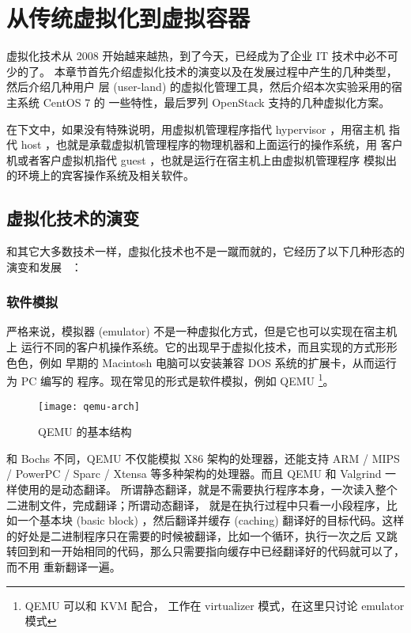 \chapter{从传统虚拟化到虚拟容器}
\label{cha:virtualization-and-container}

虚拟化技术从 2008 开始越来越热，到了今天，已经成为了企业 IT 技术中必不可少的了。
本章节首先介绍虚拟化技术的演变以及在发展过程中产生的几种类型，然后介绍几种用户
层 (user-land) 的虚拟化管理工具，然后介绍本次实验采用的宿主系统 CentOS 7 的
一些特性，最后罗列 OpenStack 支持的几种虚拟化方案。

在下文中，如果没有特殊说明，用虚拟机管理程序指代 hypervisor ，用宿主机
指代 host ，也就是承载虚拟机管理程序的物理机器和上面运行的操作系统，用
客户机或者客户虚拟机指代 guest ，也就是运行在宿主机上由虚拟机管理程序
模拟出的环境上的宾客操作系统及相关软件。

\section{虚拟化技术的演变}

和其它大多数技术一样，虚拟化技术也不是一蹴而就的，它经历了以下几种形态的演变和发展
~\cite{deep-into-kvm}：

\subsection{软件模拟}

严格来说，模拟器 (emulator) 不是一种虚拟化方式，但是它也可以实现在宿主机上
运行不同的客户机操作系统。它的出现早于虚拟化技术，而且实现的方式形形色色，例如
早期的 Macintosh 电脑可以安装兼容 DOS 系统的扩展卡，从而运行为 PC 编写的
程序。现在常见的形式是软件模拟，例如 QEMU \footnote{QEMU 可以和 KVM 配合，
工作在 virtualizer 模式，在这里只讨论 emulator 模式}。

\begin{figure}[h]
    \centering
    \texttt{[image: qemu-arch]}
    \caption{QEMU 的基本结构}
\end{figure}

和 Bochs 不同，QEMU 不仅能模拟 X86 架构的处理器，还能支持 ARM / MIPS / PowerPC
 / Sparc / Xtensa 等多种架构的处理器。而且 QEMU 和 Valgrind 一样使用的是动态翻译。
所谓静态翻译，就是不需要执行程序本身，一次读入整个二进制文件，完成翻译；所谓动态翻译，
就是在执行过程中只看一小段程序，比如一个基本块 (basic block) ，然后翻译并缓存 (caching)
翻译好的目标代码。这样的好处是二进制程序只在需要的时候被翻译，比如一个循环，执行一次之后
又跳转回到和一开始相同的代码，那么只需要指向缓存中已经翻译好的代码就可以了，而不用
重新翻译一遍。

